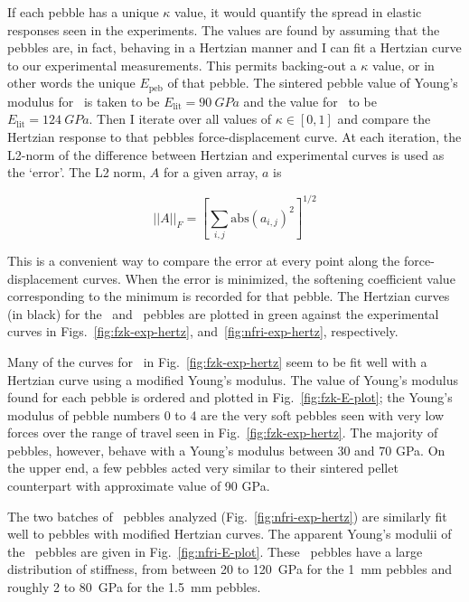 If each pebble has a unique $\kappa$ value, it would quantify the spread in elastic responses seen in the experiments. The values are found by assuming that the pebbles are, in fact, behaving in a Hertzian manner and I can fit a Hertzian curve to our experimental measurements. This permits backing-out a $\kappa$ value, or in other words the unique $E_\text{peb}$ of that pebble. The sintered pebble value of Young's modulus for \lis~is taken to be $E_\text{lit} = \si{90~GPa}$ and the value for \lit~to be $E_\text{lit}= \si{124~GPa}$. Then I iterate over all values of $\kappa\in[0,1]$ and compare the Hertzian response to that pebbles force-displacement curve. At each iteration, the L2-norm of the difference between Hertzian and experimental curves is used as the `error'. The L2 norm, $A$ for a given array, $a$ is 

\begin{equation}
||A||_F = \left[\sum_{i,j}\textrm{abs}(a_{i,j})^2\right]^{1/2}
\end{equation}

This is a convenient way to compare the error at every point along the force-displacement curves. When the error is minimized, the softening coefficient value corresponding to the minimum is recorded for that pebble. The Hertzian curves (in black) for the \lis~and \lit~pebbles are plotted in green against the experimental curves in Figs.~\ref{fig:fzk-exp-hertz}, and~\ref{fig:nfri-exp-hertz}, respectively. 

Many of the curves for \lis~in Fig.~\ref{fig:fzk-exp-hertz} seem to be fit well with a Hertzian curve using a modified Young's modulus. The value of Young's modulus found for each pebble is ordered and plotted in Fig.~\ref{fig:fzk-E-plot}; the Young's modulus of pebble numbers 0 to 4 are the very soft pebbles seen with very low forces over the range of travel seen in Fig.~\ref{fig:fzk-exp-hertz}. The majority of pebbles, however, behave with a Young's modulus between 30 and 70 \si{GPa}. On the upper end, a few pebbles acted very similar to their sintered pellet counterpart with approximate value of 90 \si{GPa}. 

The two batches of \lit~pebbles analyzed (Fig.~\ref{fig:nfri-exp-hertz}) are similarly fit well to pebbles with modified Hertzian curves. The apparent Young's modulii of the \lit~pebbles are given in Fig.~\ref{fig:nfri-E-plot}. These \lit~pebbles have a large distribution of stiffness, from between 20 to 120~GPa for the 1~mm pebbles and roughly 2 to 80~GPa for the 1.5~mm pebbles.


